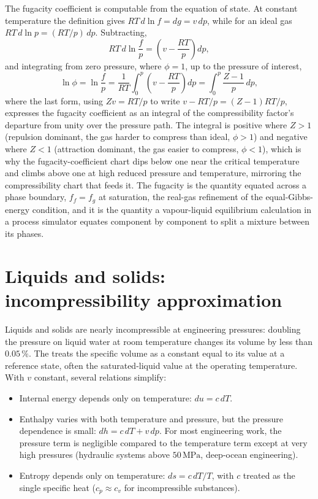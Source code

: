 The fugacity coefficient is computable from the equation of state. At
constant temperature the definition gives $RT\,d\ln f = dg = v\,dp$, while
for an ideal gas $RT\,d\ln p = (RT/p)\,dp$. Subtracting,
\[
RT\,d\ln\frac{f}{p} = \left(v - \frac{RT}{p}\right)dp,
\]
and integrating from zero pressure, where $\phi = 1$, up to the pressure of
interest,
\[
\ln\phi = \ln\frac{f}{p} = \frac{1}{RT}\int_{0}^{p}\left(v -
\frac{RT}{p}\right)dp = \int_{0}^{p}\frac{Z - 1}{p}\,dp,
\]
where the last form, using $Zv = RT/p$ to write $v - RT/p = (Z-1)RT/p$,
expresses the fugacity coefficient as an integral of the compressibility
factor's departure from unity over the pressure path. The integral is
positive where $Z > 1$ (repulsion dominant, the gas harder to compress than
ideal, $\phi > 1$) and negative where $Z < 1$ (attraction dominant, the gas
easier to compress, $\phi < 1$), which is why the fugacity-coefficient chart
dips below one near the critical temperature and climbs above one at high
reduced pressure and temperature, mirroring the compressibility chart that
feeds it. The fugacity is the quantity equated across a phase boundary,
$f_f = f_g$ at saturation, the real-gas refinement of the equal-Gibbs-energy
condition, and it is the quantity a vapour-liquid equilibrium calculation in
a process simulator equates component by component to split a mixture
between its phases.



\section{Liquids and solids: incompressibility approximation}

Liquids and solids are nearly incompressible at engineering
pressures: doubling the pressure on liquid water at room temperature
changes its volume by less than $0.05\,\%$. The
 treats the specific volume
as a constant equal to its value at a reference state, often the
saturated-liquid value at the operating temperature. With $v$
constant, several relations simplify:

\begin{itemize}[leftmargin=*]
  \item Internal energy depends only on temperature: $du = c \,dT$.
  \item Enthalpy varies with both temperature and pressure, but the
    pressure dependence is small: $dh = c\,dT + v\,dp$. For most
    engineering work, the pressure term is negligible compared to the
    temperature term except at very high pressures (hydraulic systems
    above $50\,\text{MPa}$, deep-ocean engineering).
  \item Entropy depends only on temperature: $ds = c\,dT/T$, with $c$
    treated as the single specific heat ($c_p \approx c_v$ for
    incompressible substances).
\end{itemize}

